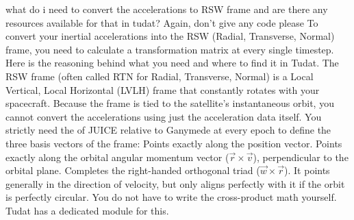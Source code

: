 {}\markdownRendererThematicBreak{}\markdownRendererInterblockSeparator
{}
\markdownRendererSectionEnd 
\markdownRendererSectionEnd \markdownRendererSectionBegin
{}\markdownRendererInterblockSeparator
{}what do i need to convert the accelerations to RSW frame and are there any resources available for that in tudat? Again, don't give any code please\markdownRendererInterblockSeparator
{}
\markdownRendererSectionEnd \markdownRendererSectionBegin
{}\markdownRendererInterblockSeparator
{}To convert your inertial accelerations into the RSW (Radial, Transverse, Normal) frame, you need to calculate a transformation matrix at every single timestep.\markdownRendererInterblockSeparator
{}Here is the reasoning behind what you need and where to find it in Tudat.\markdownRendererInterblockSeparator
{}\markdownRendererSectionBegin
{}\markdownRendererInterblockSeparator
{}The RSW frame (often called RTN for Radial, Transverse, Normal) is a Local Vertical, Local Horizontal (LVLH) frame that constantly rotates with your spacecraft.\markdownRendererInterblockSeparator
{}Because the frame is tied to the satellite's instantaneous orbit, you cannot convert the accelerations using just the acceleration data itself. You strictly need the  of JUICE relative to Ganymede at every epoch to define the three basis vectors of the frame:\markdownRendererInterblockSeparator
{}\markdownRendererUlBegin
\markdownRendererUlItem {} Points exactly along the position vector.\markdownRendererUlItemEnd 
\markdownRendererUlItem {} Points exactly along the orbital angular momentum vector ($\vec{r} \times \vec{v}$), perpendicular to the orbital plane.\markdownRendererUlItemEnd 
\markdownRendererUlItem {} Completes the right-handed orthogonal triad ($\vec{w} \times \vec{r}$). It points generally in the direction of velocity, but only aligns perfectly with it if the orbit is perfectly circular.\markdownRendererUlItemEnd 
\markdownRendererUlEnd \markdownRendererInterblockSeparator
{}
\markdownRendererSectionEnd \markdownRendererSectionBegin
{}\markdownRendererInterblockSeparator
{}You do not have to write the cross-product math yourself. Tudat has a dedicated module for this.\markdownRendererInterblockSeparator
